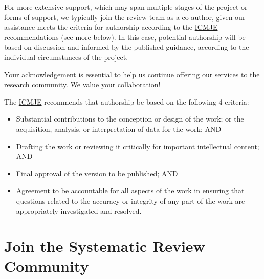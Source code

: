 \documentclass[
]{book}
\providecommand{\tightlist}{%
  \setlength{\itemsep}{0pt}\setlength{\parskip}{0pt}}
\begin{document}
For more extensive support, which may span multiple stages of the project or forms of support, we typically join the review team as a co-author, given our assistance meets the criteria for authorship according to the \href{https://www.icmje.org/recommendations/browse/roles-and-responsibilities/defining-the-role-of-authors-and-contributors.html}{ICMJE recommendations} (see more below). In this case, potential authorship will be based on discussion and informed by the published guidance, according to the individual circumstances of the project.

Your acknowledgement is essential to help us continue offering our services to the research community. We value your collaboration!

The \href{https://www.icmje.org/recommendations/browse/roles-and-responsibilities/defining-the-role-of-authors-and-contributors.html}{ICMJE} recommends that authorship be based on the following 4 criteria:

\begin{itemize}
\tightlist
\item
  Substantial contributions to the conception or design of the work; or the acquisition, analysis, or interpretation of data for the work; AND
\item
  Drafting the work or reviewing it critically for important intellectual content; AND
\item
  Final approval of the version to be published; AND
\item
  Agreement to be accountable for all aspects of the work in ensuring that questions related to the accuracy or integrity of any part of the work are appropriately investigated and resolved.
\end{itemize}

\section{Join the Systematic Review Community}\label{join-the-systematic-review-community}
\end{document}
